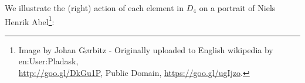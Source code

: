 \documentclass[../UNABRIDGEDalgebraNotesMSRI-UP2016.tex]{subfiles}
\begin{document}
\begin{frame}
We illustrate the (right) action of each element in $D_4$ on a portrait of Niels Henrik Abel\footnote{\tiny Image by Johan G\o rbitz - Originally uploaded to English wikipedia by en:User:Pladask,\\ \url{http://goo.gl/DkGu1P}, Public Domain, \url{https://goo.gl/ugIjzo}.
}:

\smallGap
{}
\end{frame}
\end{document}
